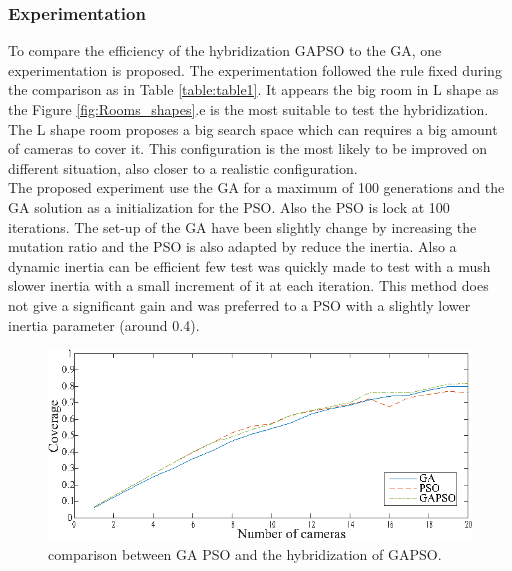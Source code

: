 \subsubsection{Experimentation }
To compare the efficiency of the hybridization GAPSO to the GA, one experimentation is proposed.
The experimentation followed the rule fixed during the comparison as in Table \ref{table:table1}. %
It appears the big room in L shape as the Figure \ref{fig:Rooms_shapes}.e is the most suitable to test the hybridization.  %
The L shape room proposes a big search space which can requires a big amount of cameras to cover it. This configuration is the most likely to be improved on different situation, also closer to a realistic configuration.\\
The proposed experiment use the GA for a maximum of 100 generations and the GA solution as a initialization for the PSO. Also the PSO is lock at 100 iterations. %
The set-up of the GA have been slightly change by increasing the mutation ratio and the PSO is also adapted by reduce the inertia. Also a dynamic inertia can be efficient few test was quickly made to test with a mush slower inertia with a small increment  of it at each iteration. This method does not give a significant gain and was preferred to a PSO with a slightly lower inertia parameter (around 0.4).
\begin{figure}[t]
  \includegraphics[width=\linewidth]{img/GAPSO_GA_PSO3.eps}
  \caption{comparison between GA PSO and the hybridization of GAPSO.
}\label{fig:GAPSO}
  \endminipage\hfill
\end{figure}

